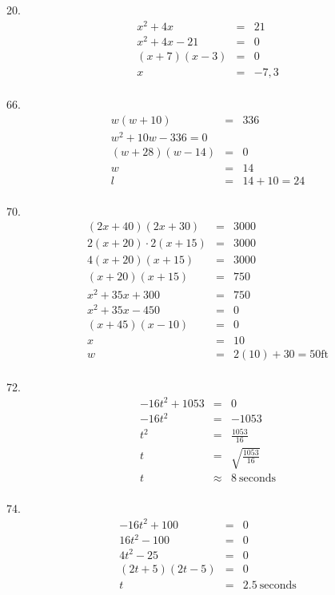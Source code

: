 \documentclass[letterpaper]{article}
\begin{document}
20.
\begin{eqnarray*}
x^2+4x &=& 21 \\
x^2+4x-21 &=& 0 \\
(x+7)(x-3) &=& 0 \\
x &=& -7,3 \\
\end{eqnarray*}

66.
\begin{eqnarray*}
w(w+10) &=& 336 \\
w^2+10w-336=0 \\
(w+28)(w-14) &=& 0 \\
w &=& 14 \\
l &=& 14+10=24 \\
\end{eqnarray*}

70.
\begin{eqnarray*}
(2x+40)(2x+30) &=& 3000 \\
2(x+20)\cdot2(x+15) &=& 3000 \\
4(x+20)(x+15) &=& 3000 \\
(x+20)(x+15) &=& 750 \\
x^2+35x+300 &=& 750 \\
x^2+35x-450 &=& 0 \\
(x+45)(x-10) &=& 0 \\
x &=& 10 \\
w &=& 2(10)+30=50\mbox{ft} \\
\end{eqnarray*}

72.
\begin{eqnarray*}
-16t^2+1053 &=& 0 \\
-16t^2 &=& -1053 \\
t^2 &=& \frac{1053}{16} \\
t &=& \sqrt{\frac{1053}{16}} \\
t &\approx& 8\ \mbox{seconds} \\
\end{eqnarray*}

74.
\begin{eqnarray*}
-16t^2+100 &=& 0 \\
16t^2-100 &=& 0 \\
4t^2-25 &=& 0 \\
(2t+5)(2t-5) &=& 0 \\
t &=& 2.5\ \mbox{seconds} \\
\end{eqnarray*}
\end{document}
